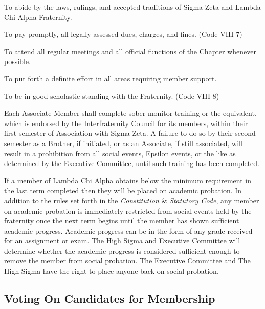 \documentclass{article}
\begin{document}
\begin{subsubsectionList}
  \item To abide by the laws, rulings, and accepted traditions of Sigma Zeta and
  Lambda Chi Alpha Fraternity.

  \item To pay promptly, all legally assessed dues, charges, and fines. (Code
  VIII‑7)

  \item To attend all regular meetings and all official functions of the Chapter
  whenever possible.

  \item To put forth a definite effort in all areas requiring member support.

  \item To be in good scholastic standing with the Fraternity. (Code VIII‑8)

  \item Each Associate Member shall complete sober monitor training or the
  equivalent, which is endorsed by the Interfraternity Council for its members,
  within their first semester of Association with Sigma Zeta. A failure to do so
  by their second semester as a Brother, if initiated, or as an Associate, if
  still associated, will result in a prohibition from all social events, Epsilon
  events, or the like as determined by the Executive Committee, until such
  training has been completed.

  \item If a member of Lambda Chi Alpha obtains below the minimum 
  requirement in the last term completed then they will be placed on academic
  probation. In addition to the rules set forth in the \emph{Constitution} \&
  \emph{Statutory Code}, any member on academic probation is immediately
  restricted from social events held by the fraternity once the next term begins
  until the member has shown sufficient academic progress. Academic progress can
  be in the form of any grade received for an assignment or exam. The High Sigma
  and Executive Committee will determine whether the academic progress is
  considered sufficient enough to remove the member from social probation. The
  Executive Committee and The High Sigma have the right to place anyone back on
  social probation.
\end{subsubsectionList}

\subsection{Voting On Candidates for Membership}
\end{document}
